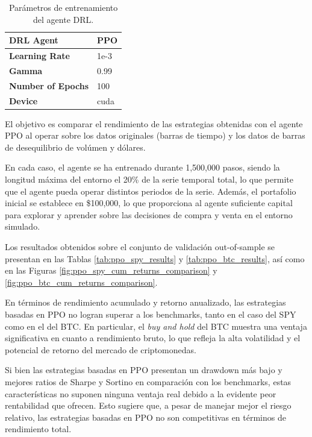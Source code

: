 \documentclass[a4paper,12pt, twoside]{report}
\begin{document}
\begin{table}[h]
    \centering
    \begin{tabular}{|l|l|}
    \hline
    \textbf{DRL Agent}  & PPO    \\ \hline
    \textbf{Learning Rate} & 1e-3  \\ \hline
    \textbf{Gamma} & 0.99  \\ \hline
    \textbf{Number of Epochs} & 100 \\ \hline
    \textbf{Device} & cuda \\ \hline
    \end{tabular}
    \caption{Parámetros de entrenamiento del agente DRL.}
    \label{tab:ppo_training_params}
\end{table}

El objetivo es comparar el rendimiento de las estrategias obtenidas con el agente PPO al operar sobre
los datos originales (barras de tiempo) y los datos de barras de desequilibrio de volúmen y dólares.

En cada caso, el agente se ha entrenado durante 1,500,000 pasos, siendo la longitud máxima del entorno
el 20\% de la serie temporal total, lo que permite que el agente pueda operar distintos periodos de la
serie. Además, el portafolio inicial se establece en \$100,000, lo que 
proporciona al agente suficiente capital para explorar y aprender sobre las decisiones de compra 
y venta en el entorno simulado. 

Los resultados obtenidos sobre el conjunto de validación out-of-sample se presentan en las 
Tablas \ref{tab:ppo_spy_results} y \ref{tab:ppo_btc_results}, así como en las Figuras 
\ref{fig:ppo_spy_cum_returns_comparison} y \ref{fig:ppo_btc_cum_returns_comparison}.

En términos de rendimiento acumulado y retorno anualizado, las estrategias basadas en PPO no logran 
superar a los benchmarks, tanto en el caso del SPY como en el del BTC. En particular, el \textit{buy and hold} del 
BTC muestra una ventaja significativa en cuanto a rendimiento bruto, lo que refleja la alta volatilidad y 
el potencial de retorno del mercado de criptomonedas.

Si bien las estrategias basadas en PPO presentan un drawdown más bajo y mejores ratios de Sharpe y Sortino en comparación 
con los benchmarks, estas características no suponen ninguna ventaja real debido a la evidente peor rentabilidad que ofrecen. 
Esto sugiere que, a pesar de manejar mejor el riesgo relativo, las estrategias basadas en PPO no son competitivas en términos 
de rendimiento total.
\end{document}
